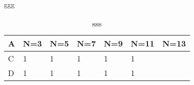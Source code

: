 ggg
\begin{table}[htbp]
\caption{sss}
\begin{tabular}{lllllll}
\toprule
A&N=3&N=5&N=7&N=9&N=11&N=13\\
\midrule
C&1&1&1&1&1\\
D&1&1&1&1&1\\
\bottomrule
\end{tabular}
\end{table}

